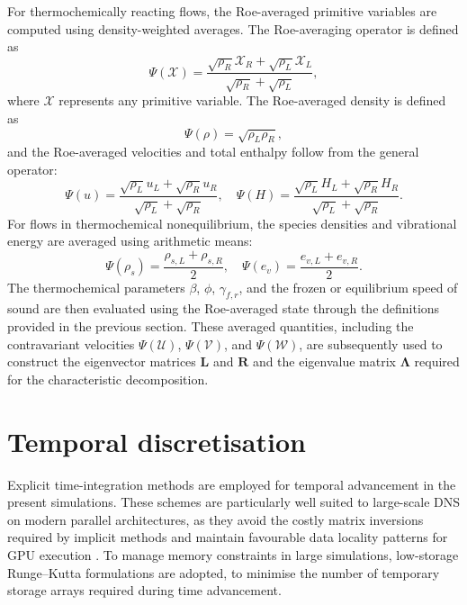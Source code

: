 For thermochemically reacting flows, the Roe-averaged primitive variables are computed using density-weighted averages. The Roe-averaging operator is defined as
\begin{equation}
\Psi(\mathcal{X}) = \frac{\sqrt{\rho_R}\mathcal{X}_R + \sqrt{\rho_L}\mathcal{X}_L}{\sqrt{\rho_R} + \sqrt{\rho_L}},
\end{equation}
where $\mathcal{X}$ represents any primitive variable. The Roe-averaged density is defined as
\begin{equation}
\Psi(\rho) = \sqrt{\rho_L \rho_R},
\end{equation}
and the Roe-averaged velocities and total enthalpy follow from the general operator:
\begin{equation}
\Psi(u) = \frac{\sqrt{\rho_L}u_L + \sqrt{\rho_R}u_R}{\sqrt{\rho_L} + \sqrt{\rho_R}}, \quad \Psi(H) = \frac{\sqrt{\rho_L}H_L + \sqrt{\rho_R}H_R}{\sqrt{\rho_L} + \sqrt{\rho_R}}.
\end{equation}
For flows in thermochemical nonequilibrium, the species densities and vibrational energy are averaged using arithmetic means:
\begin{equation}
\Psi(\rho_s) = \frac{\rho_{s,L} + \rho_{s,R}}{2}, \quad \Psi(e_v) = \frac{e_{v,L} + e_{v,R}}{2}.
\end{equation}
The thermochemical parameters $\beta$, $\phi$, $\gamma_{f,r}$, and the frozen or equilibrium speed of sound are then evaluated using the Roe-averaged state through the definitions provided in the previous section. These averaged quantities, including the contravariant velocities $\Psi(\mathcal{U})$, $\Psi(\mathcal{V})$, and $\Psi(\mathcal{W})$, are subsequently used to construct the eigenvector matrices $\mathbf{L}$ and $\mathbf{R}$ and the eigenvalue matrix $\mathbf{\Lambda}$ required for the characteristic decomposition.

\section{Temporal discretisation}

Explicit time-integration methods are employed for temporal advancement in the present simulations. These schemes are particularly well suited to large-scale \gls{DNS} on modern parallel architectures, as they avoid the costly matrix inversions required by implicit methods and maintain favourable data locality patterns for GPU execution \citep{KennedyCarpenterLewis2000}. To manage memory constraints in large simulations, low-storage Runge--Kutta formulations are adopted, to minimise the number of temporary storage arrays required during time advancement.

